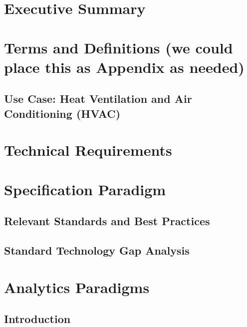 \documentclass[12pt]{article}
\begin{document}

\pagenumbering{\arabic}

\section{Executive Summary}
\newpage



\section{Terms and Definitions (we could place this as Appendix as needed)}




\clearpage

\subsection{Use Case: Heat Ventilation and Air Conditioning (HVAC)}


\section{Technical Requirements}

\section{Specification Paradigm}

\subsection{Relevant Standards and Best Practices}
\subsection{Standard Technology Gap Analysis}

\section{Analytics Paradigms}

\subsection{Introduction}
\end{document}
